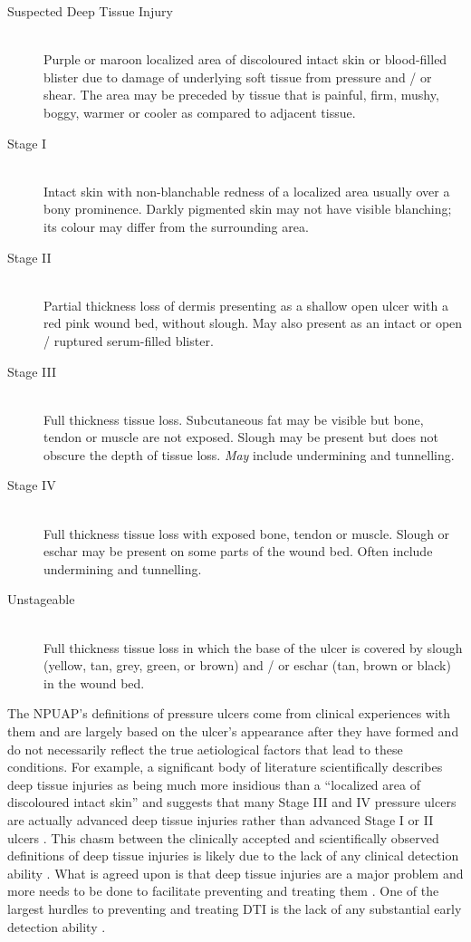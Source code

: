		\begin{description}
			\item[Suspected Deep Tissue Injury] \hfill \\
				Purple or maroon localized area of discoloured intact skin or blood-filled blister due to damage of underlying soft tissue from pressure and / or shear. The area may be preceded by tissue that is painful, firm, mushy, boggy, warmer or cooler as compared to adjacent tissue.
			\item[Stage I] \hfill \\
				Intact skin with non-blanchable redness of a localized area usually over a bony prominence. Darkly pigmented skin may not have visible blanching; its colour may differ from the surrounding area.
			\item[Stage II] \hfill \\
				Partial thickness loss of dermis presenting as a shallow open ulcer with a red pink wound bed, without slough. May also present as an intact or open / ruptured serum-filled blister.
			\item[Stage III] \hfill \\
				Full thickness tissue loss. Subcutaneous fat may be visible but bone, tendon or muscle are not exposed. Slough may be present but does not obscure the depth of tissue loss. \emph{May} include undermining and tunnelling.
			\item[Stage IV] \hfill \\
				Full thickness tissue loss with exposed bone, tendon or muscle. Slough or eschar may be present on some parts of the wound bed. Often include undermining and tunnelling.
			\item[Unstageable] \hfill \\
				Full thickness tissue loss in which the base of the ulcer is covered by slough (yellow, tan, grey, green, or brown) and / or eschar (tan, brown or black) in the wound bed.
		\end{description}

		The NPUAP's definitions of pressure ulcers come from clinical experiences with them and are largely based on the ulcer's appearance after they have formed and do not necessarily reflect the true aetiological factors that lead to these conditions. For example, a significant body of literature scientifically describes deep tissue injuries as being much more insidious than a ``localized area of discoloured intact skin'' and suggests that many Stage III and IV pressure ulcers are actually advanced deep tissue injuries rather than advanced Stage I or II ulcers \cite{gefen09}. This chasm between the clinically accepted and scientifically observed definitions of deep tissue injuries is likely due to the lack of any clinical detection ability \cite{campbell10}. What is agreed upon is that deep tissue injuries are a major problem and more needs to be done to facilitate preventing and treating them \cite{black11,maklebust05}. One of the largest hurdles to preventing and treating DTI is the lack of any substantial early detection ability \cite{gunningberg08,milne09}.

